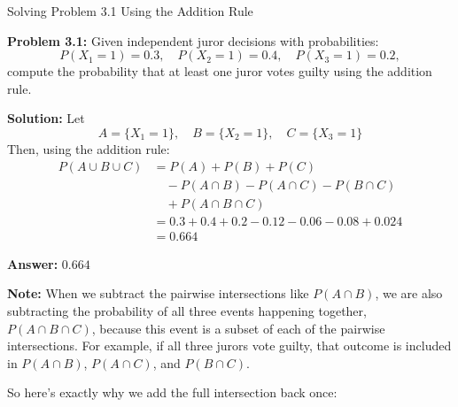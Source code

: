 \documentclass{article}
\begin{document}
\begin{center}
    \Large  Solving Problem 3.1 Using the Addition Rule
\end{center}
\vspace{2em}

\textbf{Problem 3.1:} Given independent juror decisions with probabilities:
\[
P(X_1 = 1) = 0.3,\quad P(X_2 = 1) = 0.4,\quad P(X_3 = 1) = 0.2,
\]
compute the probability that at least one juror votes guilty using the addition rule.

\textbf{Solution:} Let
\[
A = \{X_1 = 1\},\quad B = \{X_2 = 1\},\quad C = \{X_3 = 1\}
\]
Then, using the addition rule:
\[
\begin{aligned}
P(A \cup B \cup C) &= P(A) + P(B) + P(C) \\
&\quad - P(A \cap B) - P(A \cap C) - P(B \cap C) \\
&\quad + P(A \cap B \cap C) \\
&= 0.3 + 0.4 + 0.2 - 0.12 - 0.06 - 0.08 + 0.024 \\
&= 0.664
\end{aligned}
\]

\textbf{Answer:} \( \boxed{0.664} \)

\textbf{Note:} When we subtract the pairwise intersections like \( P(A \cap B) \), we are also subtracting the probability of all three events happening together, \( P(A \cap B \cap C) \), because this event is a subset of each of the pairwise intersections. For example, if all three jurors vote guilty, that outcome is included in \( P(A \cap B) \), \( P(A \cap C) \), and \( P(B \cap C) \).

So here’s exactly why we add the full intersection back once:
\end{document}
